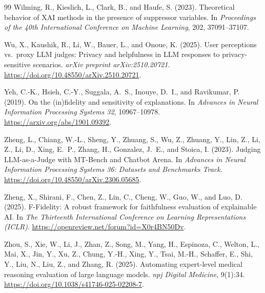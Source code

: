 \documentclass[twoside,11pt]{article}
\begin{document}
\begin{thebibliography}{99}
Wilming, R., Kieslich, L., Clark, B., and Haufe, S. (2023).
Theoretical behavior of {XAI} methods in the presence of suppressor
variables.
In \emph{Proceedings of the 40th International Conference on Machine
Learning}, 202, 37091--37107.

Wu, X., Kaushik, R., Li, W., Bauer, L., and Onoue, K. (2025).
User perceptions vs.\ proxy LLM judges: Privacy and helpfulness in LLM
responses to privacy-sensitive scenarios.
\emph{arXiv preprint arXiv:2510.20721}.
\url{https://doi.org/10.48550/arXiv.2510.20721}.

Yeh, C.-K., Hsieh, C.-Y., Suggala, A.~S., Inouye, D.~I., and
Ravikumar, P. (2019).
On the (in)fidelity and sensitivity of explanations.
In \emph{Advances in Neural Information Processing Systems 32},
10967--10978.
\url{https://arxiv.org/abs/1901.09392}.

Zheng, L., Chiang, W.-L., Sheng, Y., Zhuang, S., Wu, Z., Zhuang, Y.,
Lin, Z., Li, Z., Li, D., Xing, E.~P., Zhang, H., Gonzalez, J.~E., and
Stoica, I. (2023).
Judging LLM-as-a-Judge with MT-Bench and Chatbot Arena.
In \emph{Advances in Neural Information Processing Systems 36: Datasets
and Benchmarks Track}.
\url{https://doi.org/10.48550/arXiv.2306.05685}.

Zheng, X., Shirani, F., Chen, Z., Lin, C., Cheng, W., Guo, W., and
Luo, D. (2025).
F-Fidelity: A robust framework for faithfulness evaluation of explainable AI.
In \emph{The Thirteenth International Conference on Learning
Representations (ICLR)}.
\url{https://openreview.net/forum?id=X0r4BN50Dv}.

Zhou, S., Xie, W., Li, J., Zhan, Z., Song, M., Yang, H., Espinoza, C.,
Welton, L., Mai, X., Jin, Y., Xu, Z., Chung, Y.-H., Xing, Y., Tsai, M.-H.,
Schaffer, E., Shi, Y., Liu, N., Liu, Z., and Zhang, R. (2025).
Automating expert-level medical reasoning evaluation of large language
models.
\emph{npj Digital Medicine}, 9(1):34.
\url{https://doi.org/10.1038/s41746-025-02208-7}.

\end{thebibliography}
\end{document}
